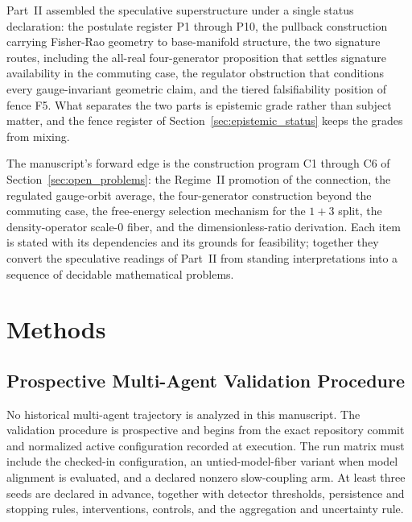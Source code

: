 \documentclass[11pt]{article}
\begin{document}
Part~II assembled the speculative superstructure under a single status declaration: the postulate register P1 through P10, the pullback construction carrying Fisher-Rao geometry to base-manifold structure, the two signature routes, including the all-real four-generator proposition that settles signature availability in the commuting case, the regulator obstruction that conditions every gauge-invariant geometric claim, and the tiered falsifiability position of fence F5. What separates the two parts is epistemic grade rather than subject matter, and the fence register of Section~\ref{sec:epistemic_status} keeps the grades from mixing.

The manuscript's forward edge is the construction program C1 through C6 of Section~\ref{sec:open_problems}: the Regime~II promotion of the connection, the regulated gauge-orbit average, the four-generator construction beyond the commuting case, the free-energy selection mechanism for the $1{+}3$ split, the density-operator scale-0 fiber, and the dimensionless-ratio derivation. Each item is stated with its dependencies and its grounds for feasibility; together they convert the speculative readings of Part~II from standing interpretations into a sequence of decidable mathematical problems.

\section{Methods}\label{sec:methods}

\subsection{Prospective Multi-Agent Validation Procedure}
\label{sec:methods_metagent}

No historical multi-agent trajectory is analyzed in this manuscript. The validation procedure is prospective and begins from the exact repository commit and normalized active configuration recorded at execution. The run matrix must include the checked-in configuration, an untied-model-fiber variant when model alignment is evaluated, and a declared nonzero slow-coupling arm. At least three seeds are declared in advance, together with detector thresholds, persistence and stopping rules, interventions, controls, and the aggregation and uncertainty rule.
\end{document}
